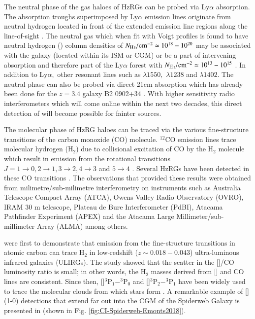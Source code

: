 The neutral phase of the gas haloes of HzRGs can be probed via Ly$\alpha$ absorption. The absorption troughs superimposed by Ly$\alpha$ emission lines originate from neutral hydrogen located in front of the extended emission line regions along the line-of-sight \citep{rottgering1995,vanojik1997}. The neutral gas which when fit with Voigt profiles is found to have neutral hydrogen () column densities of $ N_{\rm \ion{H}{i}} /\rm{cm}^{-2} \simeq 10^{18}-10^{20}$ may be associated with the galaxy (located within its ISM or CGM) or be a part of intervening absorption and therefore part of the Ly$\alpha$ forest with $N_{\rm \ion{H}{i}} /\rm{cm}^{-2} \simeq 10^{13} - 10^{15}$ \citep{wilman2004}. In addition to Ly$\alpha,$ other resonant lines such as  $\lambda1550,$  $\lambda1238$ and  $\lambda1402.$ The neutral phase can also be probed via direct  21cm absorption which has already been done for the $z=3.4$ galaxy B2 0902+34 \citep{Uson1991}. With higher sensitivity radio interferometers which will come online within the next two decades, this direct detection of  will become possible for fainter sources. 

The molecular phase of HzRG haloes can be traced via the various fine-structure transitions of the carbon monoxide (CO) molecule. $^{12}$CO emission lines trace molecular hydrogen (H$_2$) due to collisional excitation of CO by the H$_2$ molecule which result in emission from the rotational transitions $J=1\rightarrow0, 2\rightarrow1, 3\rightarrow2, 4\rightarrow3$ and $5\rightarrow4$ \citep{SolomonvandenBout2005}. Several HzRGs have been detected in these CO transitions \citep{Scoville1997,Alloin2000,deBreuck2003,Papadopoulos2000,
Greve2004,deBreuck2005,Klamer2005,Ivison2008,Emonts2014,emonts2015,Gullberg2016b}. The observations that provided these results were obtained from milimetre/sub-milimetre interferometry on instruments such as Australia Telescope Compact Array (ATCA), Owens Valley Radio Observatory (OVRO), IRAM 30 m telescope, Plateau de Bure Interferometer (PdBI), Atacama Pathfinder Experiment (APEX) and the Atacama Large Millimeter/sub-millimeter Array (ALMA) among others. 

\citet{PapadopoulosGreve2004} were first to demonstrate that emission from the fine-structure transitions in atomic carbon can trace H$_2$ in low-redshift ($z\sim0.018 - 0.043$) ultra-luminous infrared galaxies (ULIRGs). The study showed that the scatter in the []/CO luminosity ratio is small; in other words, the H$_2$ masses derived from [] and CO lines are consistent. Since then, []$^3$P$_1 - ^3$P$_0$ and []$^3$P$_2 - ^3$P$_1$ have been widely used to trace the molecular clouds from which stars form \citep{Alaghband-Zadeh2013,Bothwell2017,Popping2017,Andreani2018,Lelli2018,emonts2018,
Nesvadba2019,Man2019}. A remarkable example of [](1-0) detections that extend far out into the CGM of the Spiderweb Galaxy is presented in \citet{emonts2018} (shown in Fig. \ref{fig:CI-Spiderweb-Emonts2018}). 

